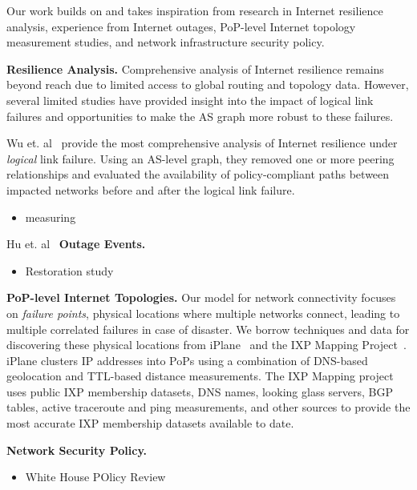 Our work builds on and takes inspiration from research in Internet resilience analysis, experience from Internet outages, PoP-level Internet topology measurement studies, and network infrastructure security policy.

{\bf Resilience Analysis.}
    Comprehensive analysis of Internet resilience remains beyond reach due to limited access to global routing and topology data. 
    However, several limited studies have provided insight into the impact of logical link failures and opportunities to make the AS graph more robust to these failures.
    
    Wu et. al~\cite{michigan} provide the most comprehensive analysis of Internet resilience under {\it logical} link failure.
    Using an AS-level graph, they removed one or more peering relationships and evaluated the availability of policy-compliant paths between impacted networks before and after the logical link failure.
    
    \begin{itemize}
        \item measuring~\cite{measuringresilience}
    \end{itemize}
    Hu et. al~\cite{ixp-routingdiversity}
{\bf Outage Events.}
\begin{itemize}
    \item Restoration study~\cite{taiwan}
\end{itemize}

{\bf PoP-level Internet Topologies.}
    Our model for network connectivity focuses on {\it failure points}, physical locations where multiple networks connect, leading to multiple correlated failures in case of disaster.
    We borrow techniques and data for discovering these physical locations from iPlane~\cite{iplane} and the IXP Mapping Project~\cite{ixps-mapped}.
    iPlane clusters IP addresses into PoPs using a combination of DNS-based geolocation and TTL-based distance measurements.
    The IXP Mapping project uses public IXP membership datasets, DNS names, looking glass servers, BGP tables, active traceroute and ping measurements, and other sources to provide the most accurate IXP membership datasets available to date. 

{\bf Network Security Policy.}
    \begin{itemize}
        \item White House POlicy Review~\cite{cyberspacepolicy} 
    \end{itemize}

